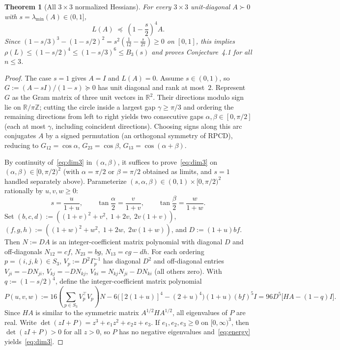 \documentclass[11pt]{article}
\theoremstyle{plain}
\newtheorem{theorem}{Theorem}
\theoremstyle{definition}
\theoremstyle{remark}
\begin{document}
\begin{theorem}[All $3 \times 3$ normalized Hessians]\label{thm:dim3}
For every $3 \times 3$ unit-diagonal $A \succ 0$ with $s = \lambda_{\min}(A) \in (0, 1]$,
\begin{equation}\label{eq:dim3}
L(A) \;\preceq\; \left(1 - \frac{s}{2}\right)^{\!4} A.
\end{equation}
Since $(1 - s/3)^3 - (1 - s/2)^2 = s^2(\frac{1}{12} - \frac{s}{27}) \ge 0$ on $[0, 1]$, this implies $\rho(L) \le (1 - s/2)^4 \le (1 - s/3)^6 \le B_3(s)$ and proves Conjecture~4.1 for all $n \le 3$.
\end{theorem}

\begin{proof}
The case $s = 1$ gives $A = I$ and $L(A) = 0$.
Assume $s \in (0, 1)$, so $G := (A - s I)/(1 - s) \succeq 0$ has unit diagonal and rank at most~$2$.
Represent $G$ as the Gram matrix of three unit vectors in $\mathbb{R}^2$.
Their directions modulo sign lie on $\mathbb{R}/\pi\mathbb{Z}$; cutting the circle inside a largest gap $\gamma \ge \pi/3$ and ordering the remaining directions from left to right yields two consecutive gaps $\alpha, \beta \in [0, \pi/2]$ (each at most $\gamma$, including coincident directions).
Choosing signs along this arc conjugates $A$ by a signed permutation (an orthogonal symmetry of RPCD), reducing to $G_{12} = \cos\alpha$, $G_{23} = \cos\beta$, $G_{13} = \cos(\alpha + \beta)$.

By continuity of~\eqref{eq:dim3} in $(\alpha, \beta)$, it suffices to prove~\eqref{eq:dim3} on $(\alpha, \beta) \in [0, \pi/2)^2$ (with $\alpha = \pi/2$ or $\beta = \pi/2$ obtained as limits, and $s = 1$ handled separately above).
Parameterize $(s, \alpha, \beta) \in (0, 1) \times [0, \pi/2)^2$ rationally by $u, v, w \ge 0$:
\[
s = \frac{u}{1 + u}, \qquad \tan\frac{\alpha}{2} = \frac{v}{1 + v}, \qquad \tan\frac{\beta}{2} = \frac{w}{1 + w}.
\]
Set $(b, c, d) := ((1 + v)^2 + v^2,\; 1 + 2v,\; 2v(1 + v))$, $(f, g, h) := ((1 + w)^2 + w^2,\; 1 + 2w,\; 2w(1 + w))$, and $D := (1 + u)bf$.
Then $N := DA$ is an integer-coefficient matrix polynomial with diagonal $D$ and off-diagonals $N_{12} = cf$, $N_{23} = bg$, $N_{13} = cg - dh$.
For each ordering $p = (i, j, k) \in S_3$, $V_p := D^2 \Gamma_p^{-1}$ has diagonal $D^2$ and off-diagonal entries $V_{ji} = -D N_{ji}$, $V_{kj} = -D N_{kj}$, $V_{ki} = N_{kj} N_{ji} - D N_{ki}$ (all others zero).
With $q := (1 - s/2)^4$, define the integer-coefficient matrix polynomial
\[
P(u, v, w) := 16\!\left(\sum_{p \in S_3} V_p^\top V_p\right)\!N
- 6\bigl([2(1 + u)]^4 - (2 + u)^4\bigr)(1 + u)(bf)^5 I
= 96 D^5\bigl[HA - (1 - q)I\bigr].
\]
Since $HA$ is similar to the symmetric matrix $A^{1/2} H A^{1/2}$, all eigenvalues of $P$ are real.
Write $\det(z I + P) = z^3 + e_1 z^2 + e_2 z + e_3$.
If $e_1, e_2, e_3 \ge 0$ on $[0, \infty)^3$, then $\det(z I + P) > 0$ for all $z > 0$, so $P$ has no negative eigenvalues and~\eqref{eq:energy} yields~\eqref{eq:dim3}.


\end{proof}
\end{document}
